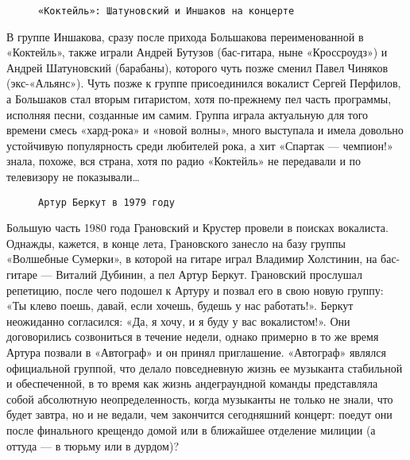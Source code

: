 \begin{figure}[h]
    \centering
    \caption{\texttt{«Коктейль»: Шатуновский и Иншаков на концерте}}
\end{figure}

В группе Иншакова, сразу после прихода Большакова переименованной в «Коктейль», также играли Андрей Бутузов (бас-гитара,
ныне «Кроссроудз») и Андрей Шатуновский (барабаны), которого чуть позже сменил Павел Чиняков (экс-«Альянс»). Чуть позже
к группе присоединился вокалист Сергей Перфилов, а Большаков стал вторым гитаристом, хотя по-прежнему пел часть
программы, исполняя песни, созданные им самим. Группа играла актуальную для того времени смесь «хард-рока» и «новой
волны», много выступала и имела довольно устойчивую популярность среди любителей рока, а хит «Спартак — чемпион!» знала,
похоже, вся страна, хотя по радио «Коктейль» не передавали и по телевизору не показывали\ldots

\begin{wrapfigure}{L}{0.5\textwidth}
    \centering
    \caption{\texttt{Артур Беркут в 1979 году}}
\end{wrapfigure}

Большую часть 1980 года Грановский и Крустер провели в поисках вокалиста. Однажды, кажется, в конце лета, Грановского
занесло на базу группы «Волшебные Сумерки», в которой на гитаре играл Владимир Холстинин, на бас-гитаре — Виталий
Дубинин, а пел Артур Беркут. Грановский прослушал репетицию, после чего подошел к Артуру и позвал его в свою новую
группу: «Ты клево поешь, давай, если хочешь, будешь у нас работать!». Беркут неожиданно согласился: «Да, я хочу, и я
буду у вас вокалистом!». Они договорились созвониться в течение недели, однако примерно в то же время Артура позвали в
«Автограф» и он принял приглашение. «Автограф» являлся официальной группой, что делало повседневную жизнь ее музыканта
стабильной и обеспеченной, в то время как жизнь андеграундной команды представляла собой абсолютную неопределенность,
когда музыканты не только не знали, что будет завтра, но и не ведали, чем закончится сегодняшний концерт: поедут они
после финального крещендо домой или в ближайшее отделение милиции (а оттуда — в тюрьму или в дурдом)?

